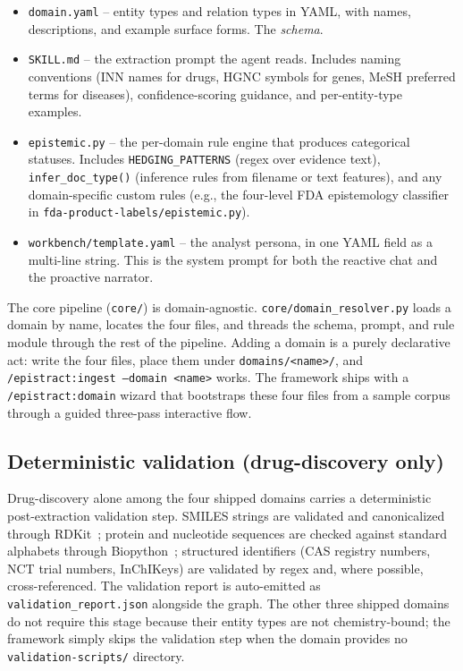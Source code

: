 \begin{itemize}
\item \texttt{domain.yaml} -- entity types and relation types in YAML, with names, descriptions, and example surface forms. The \emph{schema}.
\item \texttt{SKILL.md} -- the extraction prompt the agent reads. Includes naming conventions (INN names for drugs, HGNC symbols for genes, MeSH preferred terms for diseases), confidence-scoring guidance, and per-entity-type examples.
\item \texttt{epistemic.py} -- the per-domain rule engine that produces categorical statuses. Includes \texttt{HEDGING\_PATTERNS} (regex over evidence text), \texttt{infer\_doc\_type()} (inference rules from filename or text features), and any domain-specific custom rules (e.g., the four-level FDA epistemology classifier in \texttt{fda-product-labels/epistemic.py}).
\item \texttt{workbench/template.yaml} -- the analyst persona, in one YAML field as a multi-line string. This is the system prompt for both the reactive chat and the proactive narrator.
\end{itemize}

The core pipeline (\texttt{core/}) is domain-agnostic. \texttt{core/domain\_resolver.py} loads a domain by name, locates the four files, and threads the schema, prompt, and rule module through the rest of the pipeline. Adding a domain is a purely declarative act: write the four files, place them under \texttt{domains/<name>/}, and \texttt{/epistract:ingest --domain <name>} works. The framework ships with a \texttt{/epistract:domain} wizard that bootstraps these four files from a sample corpus through a guided three-pass interactive flow.

\subsection{Deterministic validation (drug-discovery only)}

Drug-discovery alone among the four shipped domains carries a deterministic post-extraction validation step. SMILES strings are validated and canonicalized through RDKit~\cite{rdkit2024}; protein and nucleotide sequences are checked against standard alphabets through Biopython~\cite{biopython2009}; structured identifiers (CAS registry numbers, NCT trial numbers, InChIKeys) are validated by regex and, where possible, cross-referenced. The validation report is auto-emitted as \texttt{validation\_report.json} alongside the graph. The other three shipped domains do not require this stage because their entity types are not chemistry-bound; the framework simply skips the validation step when the domain provides no \texttt{validation-scripts/} directory.

